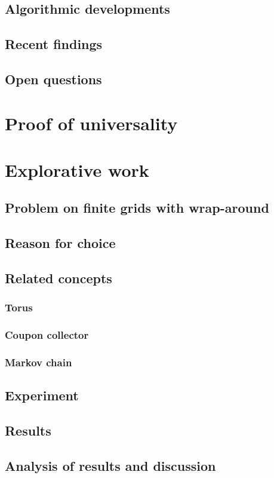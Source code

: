 \documentclass{article}
\begin{document}
\subsection{Algorithmic developments}
\subsection{Recent findings}
\subsection{Open questions}

\section{Proof of universality}

\section{Explorative work}
\subsection{Problem on finite grids with wrap-around}
\subsection{Reason for choice}
\subsection{Related concepts}
\subsubsection{Torus}
\subsubsection{Coupon collector}
\subsubsection{Markov chain}
\subsection{Experiment}
\subsection{Results}
\subsection{Analysis of results and discussion}
\end{document}
